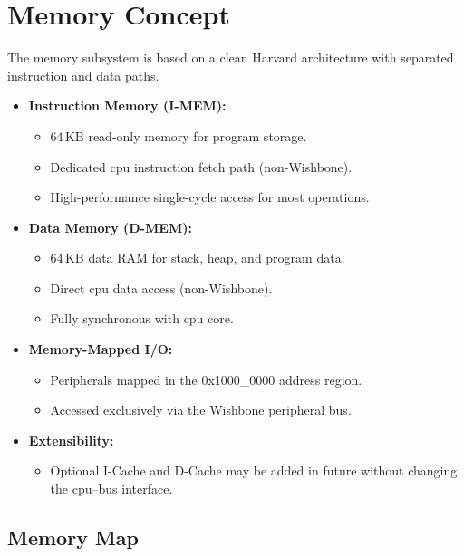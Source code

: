 \section{Memory Concept}
The memory subsystem is based on a clean \gls{Harvard} architecture with
separated instruction and data paths.

\begin{itemize}
      \item \textbf{Instruction Memory (\gls{I-MEM}):}
            \begin{itemize}
                  \item 64\,KB read-only memory for program storage.
                  \item Dedicated \gls{cpu} instruction fetch path (non-Wishbone).
                  \item High-performance single-cycle access for most operations.
            \end{itemize}

      \item \textbf{Data Memory (\gls{D-MEM}):}
            \begin{itemize}
                  \item 64\,KB data RAM for stack, heap, and program data.
                  \item Direct \gls{cpu} data access (non-Wishbone).
                  \item Fully synchronous with \gls{cpu} core.
            \end{itemize}

      \item \textbf{Memory-Mapped I/O:}
            \begin{itemize}
                  \item Peripherals mapped in the 0x1000\_0000 address region.
                  \item Accessed exclusively via the Wishbone peripheral bus.
            \end{itemize}

      \item \textbf{Extensibility:}
            \begin{itemize}
                  \item Optional I-Cache and D-Cache may be added in future without changing the
                        \gls{cpu}–bus interface.
            \end{itemize}
\end{itemize}

\subsection{Memory Map}

